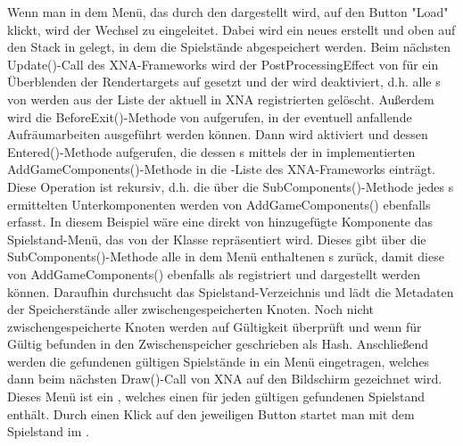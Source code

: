 Wenn man in dem Menü, das durch den  dargestellt wird, auf den Button "Load" klickt, wird der Wechsel zu  eingeleitet. Dabei wird ein neues  erstellt und oben auf den Stack in  gelegt, in dem die Spielstände abgespeichert werden.
\newline
\newline
Beim nächsten Update()-Call des XNA-Frameworks wird der PostProcessingEffect von  für ein Überblenden der Rendertargets auf  gesetzt und der  wird deaktiviert, d.h. alle s von  werden aus der Liste der aktuell in XNA registrierten  gelöscht. Außerdem wird die BeforeExit()-Methode von  aufgerufen, in der eventuell anfallende Aufräumarbeiten ausgeführt werden können.
\newline
\newline
Dann wird  aktiviert und dessen Entered()-Methode aufgerufen, die dessen s mittels der in  implementierten AddGameComponents()-Methode in die -Liste des XNA-Frameworks einträgt. Diese Operation ist rekursiv, d.h. die über die SubComponents()-Methode jedes s ermittelten Unterkomponenten werden von AddGameComponents() ebenfalls erfasst.
\newline
\newline
In diesem Beispiel wäre eine direkt von  hinzugefügte Komponente das Spielstand-Menü, das von der Klasse  repräsentiert wird. Dieses gibt über die SubComponents()-Methode alle in dem Menü enthaltenen s zurück, damit diese von AddGameComponents() ebenfalls als  registriert und dargestellt werden können.
\newline
\newline
Daraufhin durchsucht  das Spielstand-Verzeichnis und lädt die Metadaten der Speicherstände aller zwischengespeicherten Knoten.
Noch nicht zwischengespeicherte Knoten werden auf Gültigkeit überprüft und wenn für Gültig befunden in den Zwischenspeicher geschrieben als Hash.
\newline
\newline
Anschließend werden die gefundenen gültigen Spielstände in ein Menü eingetragen, welches dann beim nächsten Draw()-Call von XNA auf den Bildschirm gezeichnet wird.
Dieses Menü ist ein , welches einen  für jeden gültigen gefundenen Spielstand enthält. Durch einen Klick auf den jeweiligen Button startet man mit dem Spielstand im .
